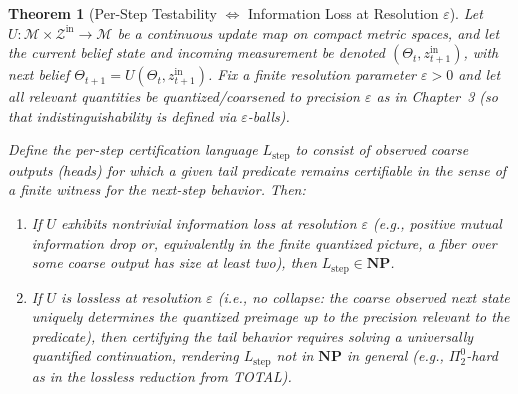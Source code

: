 \documentclass[12pt]{article}
\theoremstyle{definition}
\theoremstyle{plain}
\newtheorem{theorem}{Theorem}[section]
\begin{document}
\begin{theorem}[Per-Step Testability \(\Leftrightarrow\) Information Loss at Resolution \(\varepsilon\)] 
\label{thm:per-step-testability}
Let \(U:\mathcal{M}\times\mathcal{Z}^{\mathrm{in}}\to\mathcal{M}\) be a continuous update map on compact metric spaces, and let the current belief state and incoming measurement be denoted \((\Theta_t,z_{t+1}^{\mathrm{in}})\), with next belief \(\Theta_{t+1}=U(\Theta_t,z_{t+1}^{\mathrm{in}})\). Fix a finite resolution parameter \(\varepsilon>0\) and let all relevant quantities be quantized/coarsened to precision \(\varepsilon\) as in Chapter~3 (so that indistinguishability is defined via \(\varepsilon\)-balls). 

Define the per-step certification language \(L_{\mathrm{step}}\) to consist of observed coarse outputs (heads) for which a given tail predicate remains certifiable in the sense of a finite witness for the next-step behavior. Then:
\begin{enumerate}
    \item If \(U\) exhibits nontrivial information loss at resolution \(\varepsilon\) (e.g., positive mutual information drop or, equivalently in the finite quantized picture, a fiber over some coarse output has size at least two), then \(L_{\mathrm{step}}\in\mathbf{NP}\). 
    \item If \(U\) is lossless at resolution \(\varepsilon\) (i.e., no collapse: the coarse observed next state uniquely determines the quantized preimage up to the precision relevant to the predicate), then certifying the tail behavior requires solving a universally quantified continuation, rendering \(L_{\mathrm{step}}\) not in \(\mathbf{NP}\) in general (e.g., \(\Pi^0_2\)-hard as in the lossless reduction from \textsc{TOTAL}).
\end{enumerate}
\end{theorem}
\end{document}

